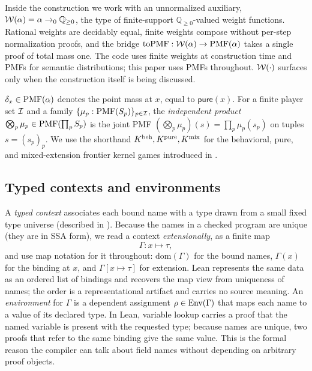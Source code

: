 \begin{remark}
\label{rem:fweight}
Inside the construction we work with an unnormalized auxiliary,
$\mathcal{W}(\alpha) = \alpha \to_0 \mathbb{Q}_{\ge 0}$, the type of finite-support
$\mathbb{Q}_{\ge 0}$-valued weight functions.  Rational weights are
decidably equal, finite weights compose without per-step normalization
proofs, and the bridge $\mathrm{toPMF} : \mathcal{W}(\alpha) \to
\mathrm{PMF}(\alpha)$ takes a single proof of total mass one.  The code uses
finite weights at construction time and PMFs for semantic distributions;
this paper uses PMFs throughout.  $\mathcal{W}(\cdot)$ surfaces only when
the construction itself is being discussed.
\end{remark}

\begin{notation}
\label{not:dirac-product}
$\delta_x \in \mathrm{PMF}(\alpha)$ denotes the point mass at $x$, equal to
$\mathsf{pure}(x)$.  For a finite player set $\mathcal{I}$ and a family
$\{\mu_p : \mathrm{PMF}(S_p)\}_{p \in \mathcal{I}}$, the \emph{independent
product} $\bigotimes_{p}\mu_p \in \mathrm{PMF}(\prod_p S_p)$ is the joint PMF
$(\bigotimes_p \mu_p)(s) = \prod_p \mu_p(s_p)$ on tuples $s = (s_p)_p$.
We use the
shorthand $K^{\mathrm{beh}}, K^{\mathrm{pure}}, K^{\mathrm{mix}}$ for the behavioral, pure, and
mixed-extension frontier kernel games introduced in
.
\end{notation}

\subsection{Typed contexts and environments}
\label{sec:prelim:contexts}

A \emph{typed context} associates each bound name with a type drawn
from a small fixed type universe (described in
).  Because the names in a checked program are
unique (they are in SSA form), we read a context \emph{extensionally},
as a finite map
\[
  \Gamma : x \mapsto \tau,
\]
and use map notation for it throughout: $\mathrm{dom}(\Gamma)$ for the
bound names, $\Gamma(x)$ for the binding at $x$, and
$\Gamma[x \mapsto \tau]$ for extension.  Lean represents the same data as
an ordered list of bindings and recovers the map view from uniqueness of
names; the order is a representational artifact and carries no source
meaning.  An \emph{environment} for $\Gamma$ is a dependent assignment
$\rho \in \mathrm{Env}(\Gamma)$ that maps each name to a value of its declared
type.  In Lean, variable lookup carries a proof that the named variable
is present with the requested type; because names are unique, two proofs
that refer to the same binding give the same value.  This is the formal
reason the compiler can talk about field names without depending on
arbitrary proof objects.

